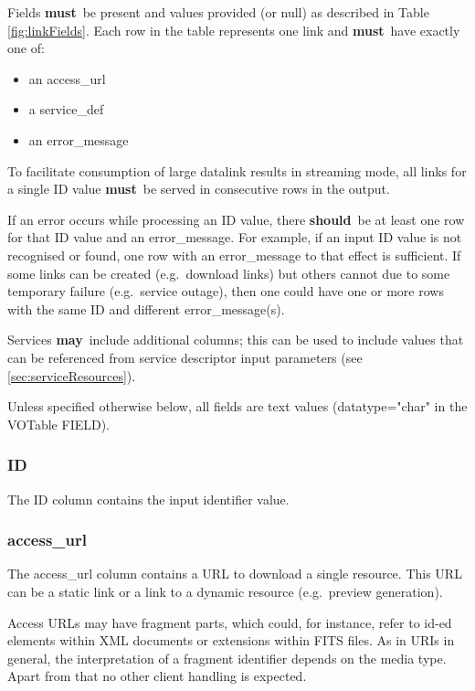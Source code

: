\documentclass[11pt,a4paper]{ivoa}
\newcommand{\attval}[2]{#1={\allowbreak}{"}#2{"}}
\newcommand{\rfcmust}{\textbf{must}}
\newcommand{\rfcshould}{\textbf{should}}
\newcommand{\rfcmay}{\textbf{may}}
\begin{document}
Fields \rfcmust\ be present and values provided
(or null) as described in Table \ref{fig:linkFields}. Each row in the table
represents one link and \rfcmust\ have exactly one of:
\begin{itemize}
  \item an access\_url
  \item a service\_def
  \item an error\_message
\end{itemize}

To facilitate consumption of large datalink results in streaming mode, all links
for a single ID value \rfcmust\ be served in consecutive rows in the output.

If an error occurs while processing an ID value, there \rfcshould\ be at least
one row for that ID value and an error\_message. For example, if an input
ID value is not recognised or found, one row with an error\_message
to that effect is sufficient.
If some links can be created (e.g.\ download links)
but others cannot due to some temporary failure (e.g.\ service outage),
then one could have one or more rows with the same ID and different
error\_message(s).

Services \rfcmay\ include additional columns; this can be used to include
values that can be referenced from service descriptor input parameters
(see \ref{sec:serviceResources}).

Unless specified otherwise below, all fields are text values (\attval{datatype}{char}
in the VOTable FIELD).

\subsubsection{ID}

The ID column contains the input identifier value.


\subsubsection{access\_url}

The access\_url column contains a URL to download a single resource.
This URL can be a static link or a link to a dynamic resource (e.g.\ preview generation).

Access URLs may have fragment parts, which could,
for instance, refer to id-ed elements within XML documents or extensions 
within FITS files. As in URIs in general, the interpretation of a fragment 
identifier depends on the media type. Apart from that no other client handling
is expected.  
\end{document}

